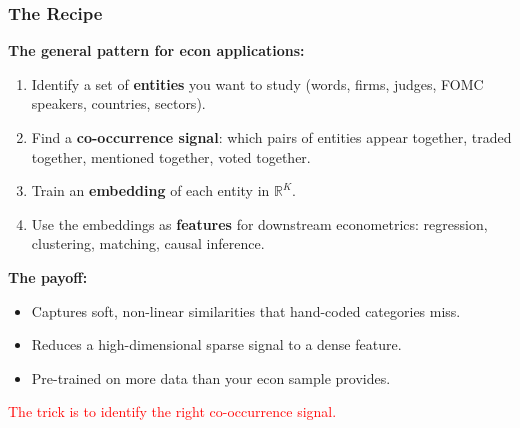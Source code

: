 \documentclass[notes,11pt, aspectratio=169]{beamer}
\newcommand{\R}{\mathbb{R}}
\begin{document}
\begin{frame}
\frametitle{The Recipe}

\textbf{The general pattern for econ applications:}

\vspace{6pt}
\begin{enumerate}
    \item Identify a set of \textbf{entities} you want to study (words, firms, judges, FOMC speakers, countries, sectors).

    \vspace{4pt}
    \item Find a \textbf{co-occurrence signal}: which pairs of entities appear together, traded together, mentioned together, voted together.

    \vspace{4pt}
    \item Train an \textbf{embedding} of each entity in $\R^K$.

    \vspace{4pt}
    \item Use the embeddings as \textbf{features} for downstream econometrics: regression, clustering, matching, causal inference.
\end{enumerate}

\vspace{12pt}
\textbf{The payoff:}
\begin{itemize}
    \item Captures soft, non-linear similarities that hand-coded categories miss.
    \item Reduces a high-dimensional sparse signal to a dense feature.
    \item Pre-trained on more data than your econ sample provides.
\end{itemize}

\textcolor{red}{The trick is to identify the right co-occurrence signal.}
\end{frame}
\end{document}
